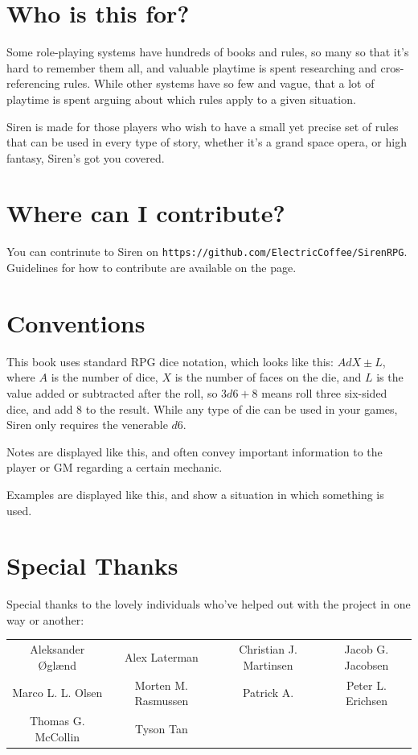 \documentclass[a4paper]{book}
\begin{document}
\section*{Who is this for?}
Some role-playing systems have hundreds of books and rules, so many so that it's hard to remember them all, and valuable playtime is spent researching and cros-referencing rules. 
While other systems have so few and vague, that a lot of playtime is spent arguing about which rules apply to a given situation.

Siren is made for those players who wish to have a small yet precise set of rules that can be used in every type of story, whether it's a grand space opera, or high fantasy, Siren's got you covered.

\section*{Where can I contribute?}
You can contrinute to Siren on \texttt{https://github.com/ElectricCoffee/SirenRPG}.
Guidelines for how to contribute are available on the page.

\section*{Conventions}
This book uses standard RPG dice notation, which looks like this: $AdX\pm L$, where $A$ is the number of dice, $X$ is the number of faces on the die, and $L$ is the value added or subtracted after the roll, so $3d6+8$ means roll three six-sided dice, and add 8 to the result.
While any type of die can be used in your games, Siren only requires the venerable $d6$.

\note Notes are displayed like this, and often convey important information to the player or GM regarding a certain mechanic.

\example Examples are displayed like this, and show a situation in which something is used.

\section*{Special Thanks}
Special thanks to the lovely individuals who've helped out with the project in one way or another:
\begin{center}
    \begin{tabular}{cccc}
        Aleksander Øglænd & Alex Laterman & Christian J. Martinsen & Jacob G. Jacobsen \\
        Marco L. L. Olsen & Morten M. Rasmussen & Patrick A. & Peter L. Erichsen \\ Thomas G. McCollin & Tyson Tan \\
    \end{tabular}
\end{center}
\end{document}
